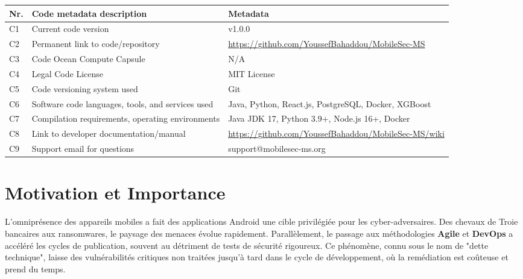 \documentclass[
  journal=largetwo,
  manuscript=article-type,
  year=2025,
  volume=1,
]{cup-journal}
\begin{document}
\begin{strip}
\centering
{}
\label{tab:metadata}
\begin{tabular}{p{1cm} p{6cm} p{9cm}}
\toprule
\textbf{Nr.} & \textbf{Code metadata description} & \textbf{Metadata} \\
\midrule
C1 & Current code version & v1.0.0 \\
C2 & Permanent link to code/repository & \url{https://github.com/YoussefBahaddou/MobileSec-MS} \\
C3 & Code Ocean Compute Capsule & N/A \\
C4 & Legal Code License & MIT License \\
C5 & Code versioning system used & Git \\
C6 & Software code languages, tools, and services used & Java, Python, React.js, PostgreSQL, Docker, XGBoost \\
C7 & Compilation requirements, operating environments & Java JDK 17, Python 3.9+, Node.js 16+, Docker \\
C8 & Link to developer documentation/manual & \url{https://github.com/YoussefBahaddou/MobileSec-MS/wiki} \\
C9 & Support email for questions & support@mobilesec-ms.org \\
\bottomrule
\end{tabular}
\end{strip}

\section{Motivation et Importance}
\label{sec:motivation}

L'omniprésence des appareils mobiles a fait des applications Android une cible privilégiée pour les cyber-adversaires. Des chevaux de Troie bancaires aux ransomwares, le paysage des menaces évolue rapidement. Parallèlement, le passage aux méthodologies \textbf{Agile} et \textbf{DevOps} a accéléré les cycles de publication, souvent au détriment de tests de sécurité rigoureux. Ce phénomène, connu sous le nom de "dette technique", laisse des vulnérabilités critiques non traitées jusqu'à tard dans le cycle de développement, où la remédiation est coûteuse et prend du temps.
\end{document}
